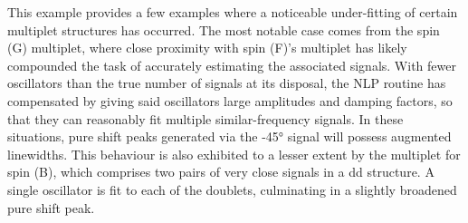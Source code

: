 This example provides a few examples where a noticeable under-fitting of
certain multiplet structures has occurred.
The most notable case comes from the spin (G) multiplet, where close proximity
with spin (F)'s multiplet has likely compounded the task of accurately
estimating the associated signals. With fewer oscillators than the true number
of signals at its disposal, the \ac{NLP} routine has compensated
by giving said oscillators large amplitudes and damping factors, so that they
can reasonably fit multiple similar-frequency signals. In these situations,
pure shift peaks generated via the \ang{-45} signal will possess augmented
linewidths.
This behaviour is also exhibited to a lesser extent by the multiplet for spin
(B), which comprises two pairs of very close signals in a dd structure. A
single oscillator is fit to each of the doublets, culminating in a slightly
broadened pure shift peak.


